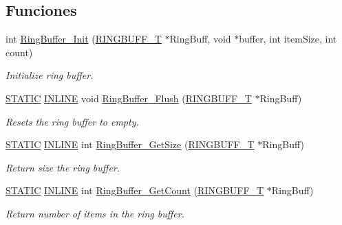 \subsection*{Funciones}
\begin{DoxyCompactItemize}
\item 
int \hyperlink{group___ring___buffer_gaaf3bb51f2228ea1bea603e19c7eba5bb}{Ring\+Buffer\+\_\+\+Init} (\hyperlink{struct_r_i_n_g_b_u_f_f___t}{R\+I\+N\+G\+B\+U\+F\+F\+\_\+T} $\ast$Ring\+Buff, void $\ast$buffer, int item\+Size, int count)
\begin{DoxyCompactList}\small\item\em Initialize ring buffer. \end{DoxyCompactList}\item 
\hyperlink{group___l_p_c___types___public___macros_ga10b2d890d871e1489bb02b7e70d9bdfb}{S\+T\+A\+T\+IC} \hyperlink{spifi__18xx__43xx_8h_a2eb6f9e0395b47b8d5e3eeae4fe0c116}{I\+N\+L\+I\+NE} void \hyperlink{group___ring___buffer_ga5f66a5dd980ef03877cf8e0c96ad4ebb}{Ring\+Buffer\+\_\+\+Flush} (\hyperlink{struct_r_i_n_g_b_u_f_f___t}{R\+I\+N\+G\+B\+U\+F\+F\+\_\+T} $\ast$Ring\+Buff)
\begin{DoxyCompactList}\small\item\em Resets the ring buffer to empty. \end{DoxyCompactList}\item 
\hyperlink{group___l_p_c___types___public___macros_ga10b2d890d871e1489bb02b7e70d9bdfb}{S\+T\+A\+T\+IC} \hyperlink{spifi__18xx__43xx_8h_a2eb6f9e0395b47b8d5e3eeae4fe0c116}{I\+N\+L\+I\+NE} int \hyperlink{group___ring___buffer_ga2fc4b40b03afb19c8ea942da3cf3faf1}{Ring\+Buffer\+\_\+\+Get\+Size} (\hyperlink{struct_r_i_n_g_b_u_f_f___t}{R\+I\+N\+G\+B\+U\+F\+F\+\_\+T} $\ast$Ring\+Buff)
\begin{DoxyCompactList}\small\item\em Return size the ring buffer. \end{DoxyCompactList}\item 
\hyperlink{group___l_p_c___types___public___macros_ga10b2d890d871e1489bb02b7e70d9bdfb}{S\+T\+A\+T\+IC} \hyperlink{spifi__18xx__43xx_8h_a2eb6f9e0395b47b8d5e3eeae4fe0c116}{I\+N\+L\+I\+NE} int \hyperlink{group___ring___buffer_ga7b69777c35694637acaf39e6bfcc1822}{Ring\+Buffer\+\_\+\+Get\+Count} (\hyperlink{struct_r_i_n_g_b_u_f_f___t}{R\+I\+N\+G\+B\+U\+F\+F\+\_\+T} $\ast$Ring\+Buff)
\begin{DoxyCompactList}\small\item\em Return number of items in the ring buffer. \end{DoxyCompactList}\item 

\end{DoxyCompactItemize}
